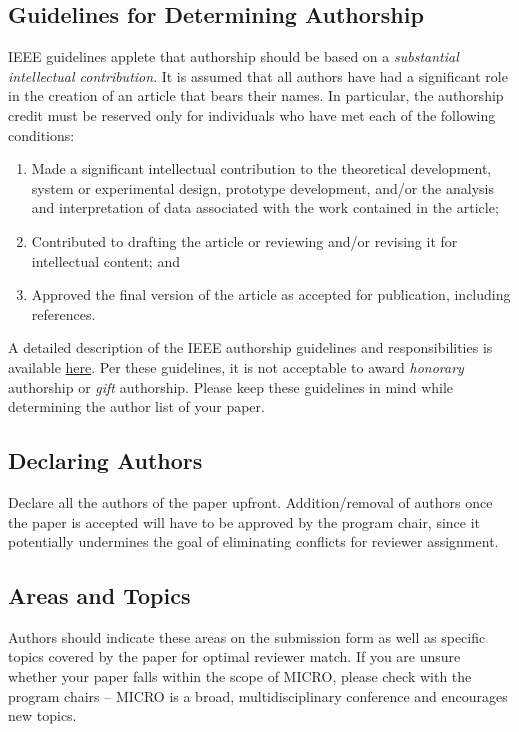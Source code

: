 \documentclass{sig-alternate}
\begin{document}
\subsection{Guidelines for Determining Authorship}
IEEE guidelines applete that authorship should be based on a {\em substantial intellectual contribution}. It is assumed that all authors have had a significant role in the creation of an article that bears their names. In particular, the authorship credit must be reserved only for individuals who have met each of the following conditions:

\begin{enumerate}
\item Made a significant intellectual contribution to the theoretical development, system or experimental design, prototype development, and/or the analysis and interpretation of data associated with the work contained in the article;

\item Contributed to drafting the article or reviewing and/or revising it for intellectual content; and

\item Approved the final version of the article as accepted for publication, including references.
\end{enumerate}

A detailed description of the IEEE authorship guidelines and responsibilities is available \href{https://www.ieee.org/publications_standards/publications/rights/Section821.html}{here}. Per these guidelines, it is not acceptable to award {\em honorary } authorship or {\em gift} authorship. Please keep these guidelines in mind while determining the author list of your paper.

\subsection{Declaring Authors}
Declare all the authors of the paper upfront. Addition/removal of authors once the paper is accepted will have to be approved by the program chair, since it potentially undermines the goal of eliminating conflicts for reviewer assignment.

\subsection{Areas and Topics}
Authors should indicate these areas on the submission form as well as specific topics covered by the paper for optimal reviewer match. If you are unsure whether your paper falls within the scope of MICRO, please check with the program chairs -- MICRO is a broad, multidisciplinary conference and encourages new topics.
\end{document}

